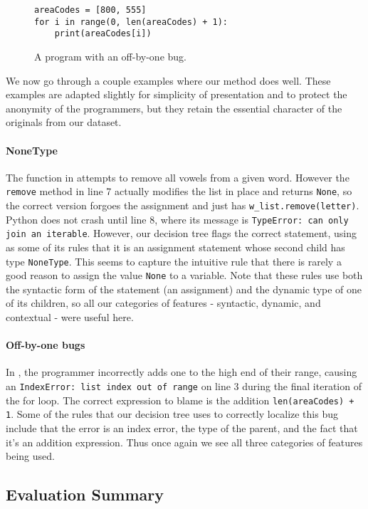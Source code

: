 \documentclass[conference]{IEEEtran}
\newcommand\lt[1]{{\lstinline|#1|}}
\begin{document}
\begin{figure}
\begin{lstlisting}
areaCodes = [800, 555]
for i in range(0, len(areaCodes) + 1):
    print(areaCodes[i])
\end{lstlisting}
\caption{A program with an off-by-one bug.}
\label{fig-win-example-two}
\end{figure}

We now go through a couple examples where our method does well. These examples
are adapted slightly for simplicity of
presentation and to protect the anonymity of the programmers, but they retain
the essential character of the originals from our dataset.

\paragraph{NoneType}
The function in  attempts to remove all vowels from a
given word. However the
\lt{remove} method in line 7 actually modifies the list in place and returns
\lt{None}, so the correct version forgoes the assignment and just has
\lt{w_list.remove(letter)}. Python does not crash until line 8, where its
message is \lt{TypeError: can only join an iterable}. However, our decision
tree flags the correct statement, using as some of its rules that it is an
assignment statement whose second child has type \lt{NoneType}. This seems to
capture the intuitive rule that there is rarely a good reason to assign the
value \lt{None} to a variable. Note that these rules use both the syntactic
form of the statement (an assignment) and the dynamic type of one of its
children, so all our categories of features - syntactic, dynamic, and
contextual - were useful here.

\paragraph{Off-by-one bugs}
In , the programmer incorrectly adds one to the high
end of their range, causing an \lt{IndexError: list index out of range} on line
3 during the final iteration of the for loop. The correct expression to blame
is the addition \lt{len(areaCodes) + 1}. Some of the rules that our
decision tree uses to correctly localize this bug include that the error is an
index error, the type of the parent, and the fact that it's an addition
expression. Thus once again we see all three categories of features being used.

\subsection{Evaluation Summary}
\end{document}
